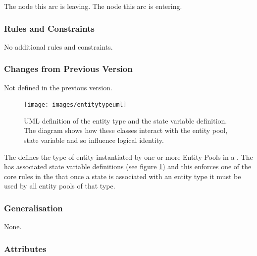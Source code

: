 \begin{attributes}
   The node this arc is leaving.
   The node this arc is entering.
\end{attributes}

\subsubsection{Rules and Constraints}

No additional rules and constraints.

\subsubsection{Changes from Previous Version}

Not defined in the previous version.


\label{defn:EntityType}

\begin{figure}[htb]
  \centering
  \texttt{[image: images/entitytypeuml]}
\caption{UML definition of the entity type and the state variable
  definition. The diagram shows how these classes interact with the
  entity pool, state variable and so influence
   logical identity.}
  \label{fig:techref:entitytypeuml}
\end{figure}

The  defines the type of entity instantiated by one or more Entity
Pools in a \PDm. The  has associated state
variable definitions (see figure \ref{fig:techref:entitytypeuml}) and
this enforces one of the core rules in the \PDl that once a state is
associated with an entity type it must be used by all entity pools of
that type.


\subsubsection{Generalisation}

None.

\subsubsection{Attributes}

